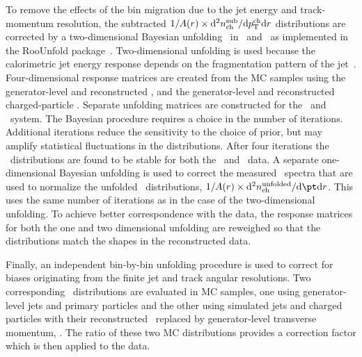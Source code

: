 To remove the effects of the bin migration due to the jet energy and track-momentum resolution, the subtracted $1/A(r) \times \mathrm{d}^2 \mbox{$n_{\mathrm{ch}}^{\mathrm{sub}}$} /\mathrm{d}\mbox{$p_{\mathrm{T}}^{\mathrm{ch}}$} \mathrm{d} r$ distributions are corrected by a two-dimensional Bayesian unfolding~\cite{DAgostini:1994zf}
in \pttrk\ and \ptjet\ as implemented in the RooUnfold package~\cite{Adye:2011gm}.  
Two-dimensional unfolding is used because the calorimetric jet energy response depends on the fragmentation pattern of the jet~\cite{Aad:2011he}.
Four-dimensional response matrices are created from the MC samples using the generator-level and reconstructed \ptjet, and the generator-level and reconstructed charged-particle \pttrk. Separate unfolding matrices are constructed for the \pp\ and \PbPb\ system. The Bayesian procedure requires a choice in the number of iterations.
Additional iterations reduce the sensitivity to the choice of prior, but may
amplify statistical fluctuations in the distributions.
After four iterations the 
\Dptr\ distributions are found to be stable for both the \PbPb\ and \pp\ data. 
A separate one-dimensional Bayesian unfolding is used to correct the measured \ptjet\ spectra that are used to normalize the unfolded \Dptr\ distributions, $1/A(r) \times \fd^2 \nchunf / \fd \pt \fd r $. This uses the same number of iterations as in the case of the two-dimensional unfolding. To achieve better correspondence with the data, the response matrices for both the one and two dimensional unfolding are reweighed so that the distributions match the shapes in the reconstructed data.

Finally, an independent bin-by-bin unfolding procedure is used to correct for biases originating from the finite jet and track angular resolutions. Two corresponding \Dptr\ distributions are evaluated in MC samples, one using generator-level jets and primary particles and the other using simulated jets and charged particles with their reconstructed \pttrk\ replaced by generator-level transverse momentum, \pTtrue. The ratio of these two MC distributions provides a correction factor which is then applied to the data. 


